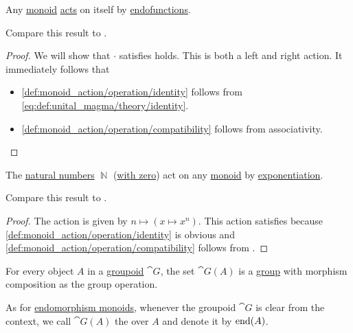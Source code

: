 \begin{proposition}\label{thm:monoid_is_action}
  Any \hyperref[def:unital_magma/monoid]{monoid} \hyperref[def:monoid_action]{acts} on itself by \hyperref[def:multi_valued_function/endofunction]{endofunctions}.

  Compare this result to .
\end{proposition}
\begin{proof}
  We will show that \( \cdot \) satisfies  holds. This is both a left and right action. It immediately follows that
  \begin{itemize}
    \item \ref{def:monoid_action/operation/identity} follows from \eqref{eq:def:unital_magma/theory/identity}.

    \item \ref{def:monoid_action/operation/compatibility} follows from associativity.
  \end{itemize}
\end{proof}

\begin{proposition}\label{thm:natural_numbers_monoid_action}
  The \hyperref[def:set_of_natural_numbers]{natural numbers} \( \BbbN \) (\hyperref[rem:peano_arithmetic_zero]{with zero}) act on any \hyperref[def:unital_magma/monoid]{monoid} by \hyperref[def:unital_magma/exponentiation]{exponentiation}.

  Compare this result to .
\end{proposition}
\begin{proof}
  The action is given by \( n \mapsto (x \mapsto x^n) \). This action satisfies  because \ref{def:monoid_action/operation/identity} is obvious and \ref{def:monoid_action/operation/compatibility} follows from .
\end{proof}

\begin{definition}\label{def:automorphism_group}
  For every object \( A \) in a \hyperref[def:groupoid]{groupoid} \( \cat{G} \), the set \( \cat{G}(A) \) is a \hyperref[def:group]{group} with morphism composition as the group operation.

  As for \hyperref[def:endomorphism_monoid]{endomorphism monoids}, whenever the groupoid \( \cat{G} \) is clear from the context, we call \( \cat{G}(A) \) the  over \( A \) and denote it by \( \operatorname{end}(A) \).
\end{definition}

